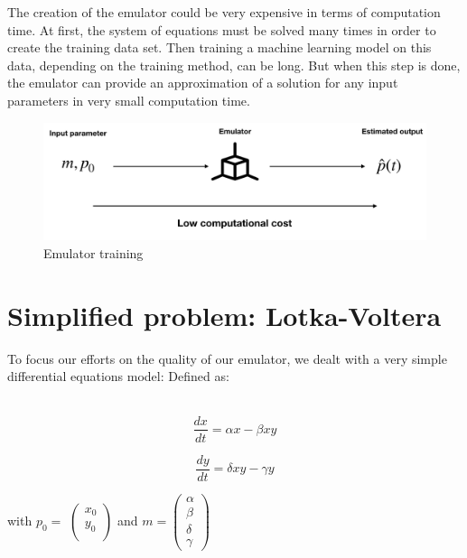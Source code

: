 \documentclass{article}
\begin{document}
The creation of the emulator could be very expensive in terms of computation time. At first, the system of equations must be solved many times in order to create the training data set. Then training a machine learning model on this data, depending on the training method, can be long. But when this step is done, the emulator can provide an approximation of a solution for any input parameters in very small computation time.

\begin{figure}[H]
\centering
\includegraphics[scale=0.4]{image/emulator_after_training.png}
\caption{Emulator training}
\label{fig: Emulator estimation}
\end{figure}

\section{Simplified problem: Lotka-Voltera}

To focus our efforts on the quality of our emulator, we dealt with a very simple differential equations model:
Defined as:

\\
\begin{equation}
   \frac{dx}{dt}= \alpha x -\beta xy
\end{equation}

\begin{equation}
\frac{dy}{dt}= \delta xy - \gamma y
\end{equation}



with $p_0 =$ $\begin{pmatrix} x_0\\ y_0\\ \end{pmatrix}$
and  
$m = \begin{pmatrix} \alpha \\ \beta \\ \delta \\ \gamma \end{pmatrix}$
\\
\end{document}
